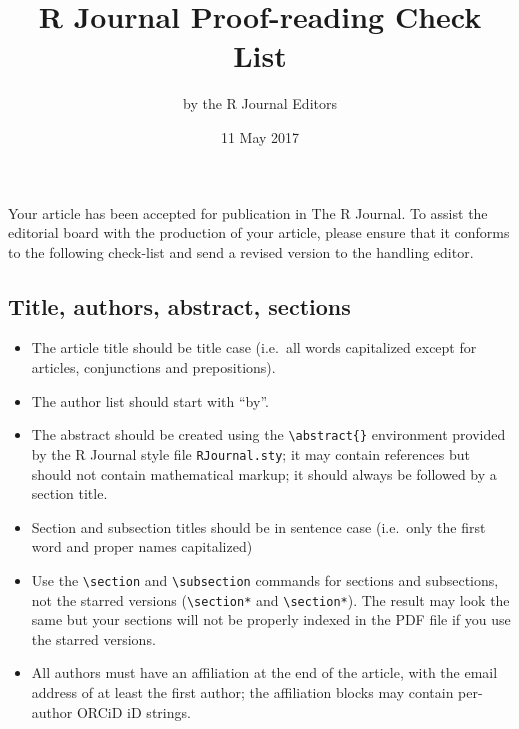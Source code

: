 \documentclass[11pt]{article}
\begin{document}
\title{R Journal Proof-reading Check List}
\author{by the R Journal Editors}
\date{11 May 2017}
\maketitle

Your article has been accepted for publication in The R Journal. To
assist the editorial board with the production of your article, please
ensure that it conforms to the following check-list and send a revised
version to the handling editor.

\subsection*{Title, authors, abstract, sections}
\begin{itemize}
\item The article title should be title case (i.e.\ all words capitalized
   except for articles, conjunctions and prepositions).
\item The author list should start with ``by''.
\item The abstract should be created using the \verb+\abstract{}+
   environment provided by the R Journal style file \texttt{RJournal.sty}; it
   may contain references but should not contain mathematical markup; 
   it should always be followed by a section title.
\item  Section and subsection titles should be in sentence case (i.e.\ only
   the first word and proper names capitalized)
\item Use the \verb+\section+ and \verb+\subsection+ commands for sections and 
      subsections, not the starred versions (\verb+\section*+
      and \verb+\section*+). The result may look the same but your
      sections will not be properly indexed in the PDF file if you use
      the starred versions.
\item All authors must have an affiliation at the end of the article,
      with the email address of at least the first author; the affiliation
      blocks may contain per-author ORCiD iD strings.
\end{itemize}
\end{document}
